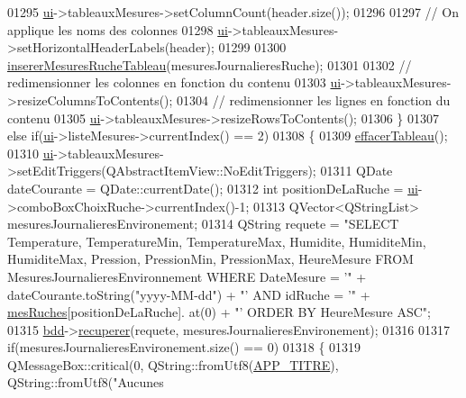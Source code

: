 \begin{DoxyCode}
01295         \hyperlink{class_ruche_ihm_a64786058bd7f88ca2f1e9743bb27c25b}{ui}->tableauxMesures->setColumnCount(header.size());
01296 
01297         \textcolor{comment}{// On applique les noms des colonnes}
01298         \hyperlink{class_ruche_ihm_a64786058bd7f88ca2f1e9743bb27c25b}{ui}->tableauxMesures->setHorizontalHeaderLabels(header);
01299 
01300         \hyperlink{class_ruche_ihm_afada4cd970c0e34c3fd62d63e5af7a88}{insererMesuresRucheTableau}(mesuresJournalieresRuche);
01301 
01302         \textcolor{comment}{// redimensionner les colonnes en fonction du contenu}
01303         \hyperlink{class_ruche_ihm_a64786058bd7f88ca2f1e9743bb27c25b}{ui}->tableauxMesures->resizeColumnsToContents();
01304         \textcolor{comment}{// redimensionner les lignes en fonction du contenu}
01305         \hyperlink{class_ruche_ihm_a64786058bd7f88ca2f1e9743bb27c25b}{ui}->tableauxMesures->resizeRowsToContents();
01306     \}
01307     \textcolor{keywordflow}{else} \textcolor{keywordflow}{if}(\hyperlink{class_ruche_ihm_a64786058bd7f88ca2f1e9743bb27c25b}{ui}->listeMesures->currentIndex() == 2)
01308     \{
01309         \hyperlink{class_ruche_ihm_a386868ba4e6e37b9d877fe3ab330e605}{effacerTableau}();
01310         \hyperlink{class_ruche_ihm_a64786058bd7f88ca2f1e9743bb27c25b}{ui}->tableauxMesures->setEditTriggers(QAbstractItemView::NoEditTriggers);
01311         QDate dateCourante = QDate::currentDate();
01312         \textcolor{keywordtype}{int} positionDeLaRuche = \hyperlink{class_ruche_ihm_a64786058bd7f88ca2f1e9743bb27c25b}{ui}->comboBoxChoixRuche->currentIndex()-1;
01313         QVector<QStringList> mesuresJournalieresEnvironement;
01314         QString requete = \textcolor{stringliteral}{"SELECT Temperature, TemperatureMin, TemperatureMax, Humidite, HumiditeMin,
       HumiditeMax, Pression, PressionMin, PressionMax, HeureMesure FROM MesuresJournalieresEnvironnement WHERE
       DateMesure = '"} + dateCourante.toString(\textcolor{stringliteral}{"yyyy-MM-dd"}) + \textcolor{stringliteral}{"' AND idRuche = '"} + \hyperlink{class_ruche_ihm_ab7741fa67b19cbb2da7eb12c58cf83c1}{mesRuches}[positionDeLaRuche].
      at(0) + \textcolor{stringliteral}{"' ORDER BY HeureMesure ASC"};
01315         \hyperlink{class_ruche_ihm_a0851936fe212e8d40538264f09749153}{bdd}->\hyperlink{class_base_de_donnees_a77539baad389f5acf754cd2cd452403e}{recuperer}(requete, mesuresJournalieresEnvironement);
01316 
01317         \textcolor{keywordflow}{if}(mesuresJournalieresEnvironement.size() == 0)
01318         \{
01319             QMessageBox::critical(0, QString::fromUtf8(\hyperlink{parametres_8h_ace364d1ce44aa9f79bcff6e3752c4a5f}{APP\_TITRE}), QString::fromUtf8(\textcolor{stringliteral}{"Aucunes
}
\end{DoxyCode}
